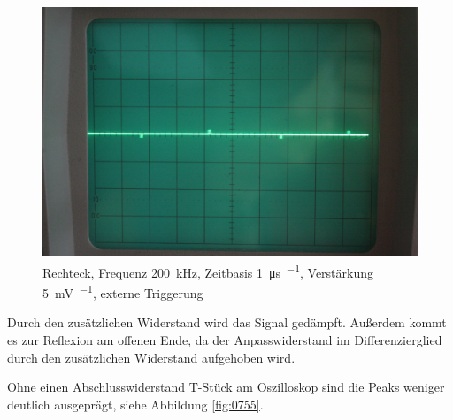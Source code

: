 \begin{figure}
	\centering
	\begin{minipage}{.45\linewidth}
	\end{minipage}
	\hfill
	\begin{minipage}{.45\linewidth}
	\includegraphics[width=\linewidth]{Fotos/IMG_0753-1500.jpg}
	\end{minipage}
	\caption{%
		Rechteck, Frequenz \SI{200}{\kilo\hertz}, Zeitbasis \SI{1}{\micro\second\per\division}, Verstärkung \SI{5}{\milli\volt\per\division}, externe Triggerung
	}
	\label{fig:0753}
\end{figure}

Durch den zusätzlichen Widerstand wird das Signal gedämpft. Außerdem kommt es zur Reflexion am offenen Ende, da der Anpasswiderstand im Differenzierglied durch den zusätzlichen Widerstand aufgehoben wird.

Ohne einen Abschlusswiderstand T-Stück am Oszilloskop sind die Peaks weniger deutlich ausgeprägt, siehe Abbildung \ref{fig:0755}.

